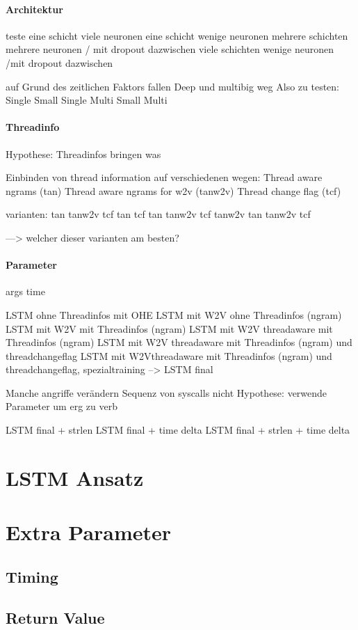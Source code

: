         \paragraph{Architektur}
            teste eine schicht viele neuronen 
            eine schicht wenige neuronen
            mehrere schichten mehrere neuronen / mit dropout dazwischen
            viele schichten wenige neuronen /mit dropout dazwischen

            auf Grund des zeitlichen Faktors fallen Deep und multibig weg
            Also zu testen:
            Single Small
            Single 
            Multi Small
            Multi 

        \paragraph{Threadinfo}
            Hypothese:
            Threadinfos bringen was

            Einbinden von thread information auf verschiedenen wegen:
            Thread aware ngrams (tan)
            Thread aware ngrams for w2v (tanw2v)
            Thread change flag (tcf)

            varianten:
            tan
            tanw2v
            tcf
            tan tcf
            tan tanw2v
            tcf tanw2v
            tan tanw2v tcf

            ---> welcher dieser varianten am besten?

        \paragraph{Parameter}
            args
            time

            LSTM ohne Threadinfos mit OHE
            LSTM mit W2V ohne Threadinfos (ngram)
            LSTM mit W2V mit Threadinfos (ngram)
            LSTM mit W2V threadaware mit Threadinfos (ngram)
            LSTM mit W2V threadaware mit Threadinfos (ngram) und threadchangeflag
            LSTM mit W2Vthreadaware mit Threadinfos (ngram) und threadchangeflag, spezialtraining
            --> LSTM final

            Manche angriffe verändern Sequenz von syscalls nicht
            Hypothese:
            verwende Parameter um erg zu verb

            LSTM final + strlen
            LSTM final + time delta
            LSTM final + strlen + time delta
\section{LSTM Ansatz}


\section{Extra Parameter}
    \subsection{Timing}\label{sec:Ergebnis_timing}
    \subsection{Return Value}\label{sec:Ergebnis_return}


